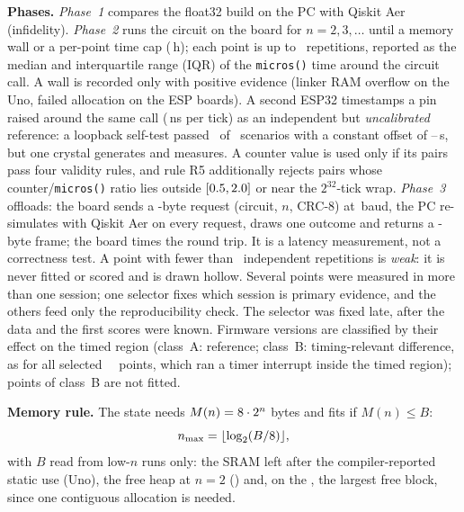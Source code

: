 \documentclass[conference,a4paper,10pt]{IEEEtran}
\begin{document}
\textbf{Phases.} \emph{Phase~1} compares the float32 build on the PC with Qiskit Aer (infidelity). \emph{Phase~2} runs the circuit on the board for $n=2,3,\ldots$ until a memory wall or a per-point time cap (\PointCapH\,h); each point is up to \Reps\ repetitions, reported as the median and interquartile range (IQR) of the \texttt{micros()} time around the circuit call. A wall is recorded only with positive evidence (linker RAM overflow on the Uno, failed allocation on the ESP boards). A second ESP32 timestamps a pin raised around the same call (\CounterTickNs\,ns per tick) as an independent but \emph{uncalibrated} reference: a loopback self-test passed \SelfTestPass\ of \SelfTestAll\ scenarios with a constant offset of \SelfTestLo--\SelfTestHi\,\textmu s, but one crystal generates and measures. A counter value is used only if its pairs pass four validity rules, and rule R5 additionally rejects pairs whose counter/\texttt{micros()} ratio lies outside $[0.5,2.0]$ or near the $2^{32}$-tick wrap. \emph{Phase~3} offloads: the board sends a \ReqBytes-byte request (circuit, $n$, CRC-8) at \BaudSp\,baud, the PC re-simulates with Qiskit Aer on every request, draws one outcome and returns a \RespBytes-byte frame; the board times the round trip. It is a latency measurement, not a correctness test. A point with fewer than \WeakMin\ independent repetitions is \emph{weak}: it is never fitted or scored and is drawn hollow. Several points were measured in more than one session; one selector fixes which session is primary evidence, and the others feed only the reproducibility check. The selector was fixed late, after the data and the first scores were known. Firmware versions are classified by their effect on the timed region (class~A: reference; class~B: timing-relevant difference, as for all selected \espA\ \grover\ points, which ran a timer interrupt inside the timed region); points of class~B are not fitted.

\textbf{Memory rule.} The state needs $M(n)=8\cdot2^n$ bytes and fits if $M(n)\le B$:
\begin{equation}\label{eq:mem}n_{\max}=\lfloor\log_2(B/8)\rfloor,\end{equation}
with $B$ read from low-$n$ runs only: the SRAM left after the compiler-reported static use (Uno), the free heap at $n=2$ (\espA) and, on the \espB, the largest free block, since one contiguous allocation is needed.
\end{document}
